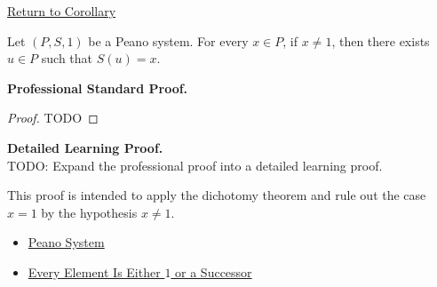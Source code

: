 \newpage
{}
\label{prf:non-one-elements-have-a-predecessor}

\begin{remark*}[Return]
\hyperref[cor:non-one-elements-have-a-predecessor]{Return to Corollary}
\end{remark*}

\begin{corollary*}
Let $(P,S,1)$ be a Peano system. For every $x \in P$, if $x \neq 1$, then
there exists $u \in P$ such that $S(u)=x$.
\end{corollary*}

\textbf{Professional Standard Proof.}~\\
\begin{proof}
TODO
\end{proof}

\textbf{Detailed Learning Proof.}~\\
TODO: Expand the professional proof into a detailed learning proof.


\begin{remark*}
This proof is intended to apply the dichotomy theorem and rule out the case
$x=1$ by the hypothesis $x\neq 1$.
\end{remark*}

\begin{dependencies}
\begin{itemize}
  \item \hyperref[def:peano-system]{Peano System}
  \item \hyperref[thm:every-element-is-one-or-a-successor]{Every Element Is Either $1$ or a Successor}
\end{itemize}
\end{dependencies}

